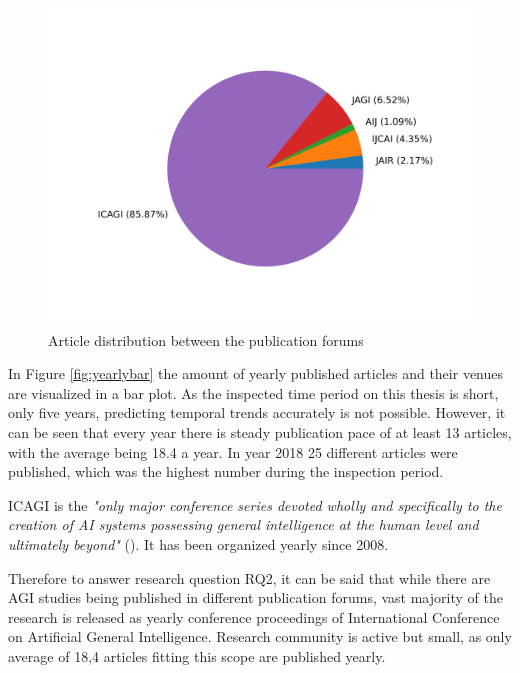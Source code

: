\documentclass[utf8,english]{gradu3}
\begin{document}
 \begin{figure}[H]
  \centering
  \includegraphics[scale=0.70]{material/data/forum_pie.png}
  \caption{Article distribution between the publication forums}
  \label{fig:forumpie}
\end{figure}

In Figure \ref{fig:yearlybar} the amount of yearly published articles and their
venues are visualized in a bar plot. As the inspected time period on this thesis
is short, only five years, predicting temporal trends accurately is not
possible. However, it can be seen that every year there is steady publication
pace of at least 13 articles, with the average being 18.4 a year. In year 2018
25 different articles were published, which was the highest number during the
inspection period.

ICAGI is the \emph{"only major conference series devoted wholly and specifically to
the creation of AI systems possessing general intelligence at the human level
and ultimately beyond"} (\cite{icagihome}). It has been organized yearly since
2008.

Therefore to answer research question RQ2, it can be said that while there are
AGI studies being published in different publication forums, vast majority of
the research is released as yearly conference proceedings of International
Conference on Artificial General Intelligence. Research community is active but
small, as only average of 18,4 articles fitting this scope are published yearly.
\end{document}

